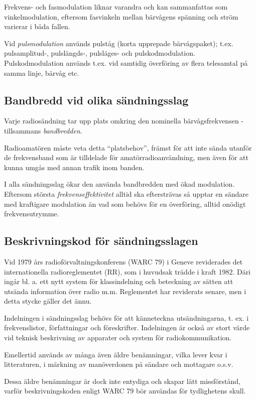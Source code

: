 Frekvens- och fasmodulation liknar varandra och kan sammanfattas som
vinkelmodulation, eftersom fasvinkeln mellan bärvågens spänning och ström
varierar i båda fallen.

Vid \emph{pulsmodulation} används pulståg (korta upprepade bärvågspaket); t.ex.
pulsamplitud-, pulslängds-, pulsläges- och pulskodmodulation. Pulskodmodulation
används t.ex. vid samtidig överföring av flera telesamtal på samma linje,
bärvåg etc.

\subsection{Bandbredd vid olika sändningsslag}

Varje radiosändning tar upp plats omkring den nominella bärvågsfrekvensen -
tillsammans \emph{bandbredden}.

Radioamatören måste veta detta ``platsbehov'', främst för att inte sända utanför
de frekvensband som är tilldelade för amatörradioanvändning, men även för att
kunna umgås med annan trafik inom banden.

I alla sändningsslag ökar den använda bandbredden med ökad modulation. Eftersom
största \emph{frekvenseffektivitet} alltid ska eftersträvas så upptar en
sändare med kraftigare modulation än vad som behövs för en överföring, alltid
onödigt frekvensutrymme.

\subsection{Beskrivningskod för sändningsslagen}

Vid 1979 års radioförvaltningskonferens (WARC 79) i Geneve reviderades det
internationella radioreglementet (RR), som i huvudsak trädde i kraft 1982.
Däri ingår bl. a. ett nytt system för klassindelning och beteckning av sätten
att utsända information över radio m.m. Reglementet har reviderats senare, men
i detta stycke gäller det ännu.

Indelningen i sändningsslag behövs för att känneteckna utsändningarna, t. ex. i
frekvenslistor, författningar och föreskrifter. Indelningen är också av stort
värde vid teknisk beskrivning av apparater och system för radiokommunikation.

Emellertid används av många även äldre benämningar, vilka lever kvar i
litteraturen, i märkning av manöverdonen på sändare och mottagare o.s.v.

Dessa äldre benämningar är dock inte entydiga och skapar lätt missförstånd,
varför beskrivningskoden enligt WARC 79 bör användas för tydlighetens skull.

